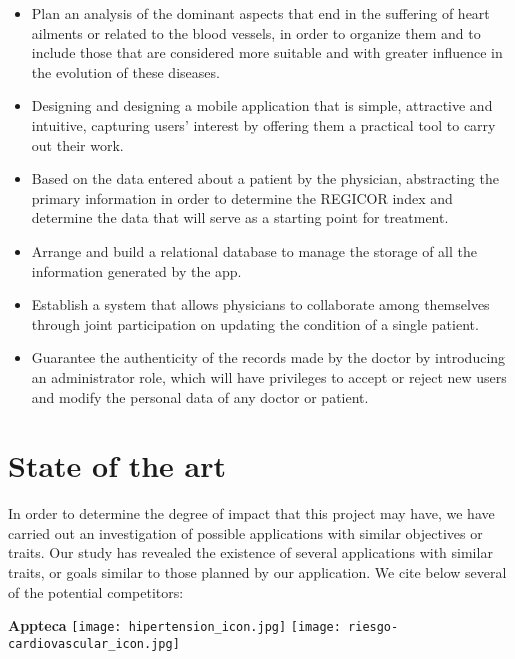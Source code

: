 \documentclass[11pt,spanish,
		listoftables,listoffigures]
		{tfgplantilla}
\begin{document}
\begin{itemize}
    \item Plan an analysis of the dominant aspects that end in the suffering of heart ailments or related to the blood vessels, in order to organize them and to include those that are considered more suitable and with greater influence in the evolution of these diseases.

    \item Designing and designing a mobile application that is simple, attractive and intuitive, capturing users' interest by offering them a practical tool to carry out their work.
    
    \item Based on the data entered about a patient by the physician, abstracting the primary information in order to determine the REGICOR index and determine the data that will serve as a starting point for treatment.
    
    \item Arrange and build a relational database to manage the storage of all the information generated by the app. 
    
    \item Establish a system that allows physicians to collaborate among themselves through joint participation on updating the condition of a single patient.
    
    \item Guarantee the authenticity of the records made by the doctor by introducing an administrator role, which will have privileges to accept or reject new users and modify the personal data of any doctor or patient. 
\end{itemize}

\section{State of the art}

In order to determine the degree of impact that this project may have, we have carried out an investigation of possible applications with similar objectives or traits. Our study has revealed the existence of several applications with similar traits, or goals similar to those planned by our application. We cite below several of the potential competitors:

\noindent
\textbf {Appteca }
\texttt{[image: hipertension\_icon.jpg]}
\texttt{[image: riesgo-cardiovascular\_icon.jpg]}  
\end{document}
